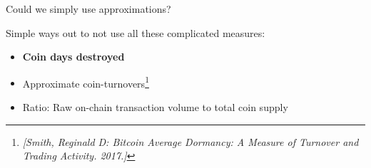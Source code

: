 \begin{frame}{Could we simply use approximations?}
  
  Simple ways out to not use all these complicated measures:
  \begin{itemize}\setlength{\itemsep}{0.5em}
  \item \textbf{Coin days destroyed}
  \item Approximate coin-turnovers\footnote{\emph{\scriptsize[Smith, Reginald D: Bitcoin Average Dormancy: {A} Measure of Turnover and Trading Activity. 2017.]}}%
  \item Ratio: Raw on-chain transaction volume to total coin supply
  \end{itemize}

\end{frame}






